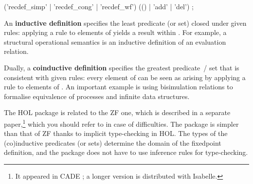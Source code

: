 \begin{isabellebody}
\begin{isamarkuptext}
  \begin{rail}
    ('recdef_simp' | 'recdef_cong' | 'recdef_wf') (() | 'add' | 'del')
    ;
  \end{rail}%
\end{isamarkuptext}%
\isamarkuptrue%
%
\isamarkuptrue%
%
\begin{isamarkuptext}%
An \textbf{inductive definition} specifies the least predicate (or
  set)  closed under given rules: applying a rule to elements
  of  yields a result within .  For example, a
  structural operational semantics is an inductive definition of an
  evaluation relation.

  Dually, a \textbf{coinductive definition} specifies the greatest
  predicate~/ set  that is consistent with given rules: every
  element of  can be seen as arising by applying a rule to
  elements of .  An important example is using bisimulation
  relations to formalise equivalence of processes and infinite data
  structures.

  \medskip The HOL package is related to the ZF one, which is
  described in a separate paper,\footnote{It appeared in CADE
  \cite{paulson-CADE}; a longer version is distributed with Isabelle.}
  which you should refer to in case of difficulties.  The package is
  simpler than that of ZF thanks to implicit type-checking in HOL.
  The types of the (co)inductive predicates (or sets) determine the
  domain of the fixedpoint definition, and the package does not have
  to use inference rules for type-checking.


\end{isamarkuptext}
\end{isabellebody}
